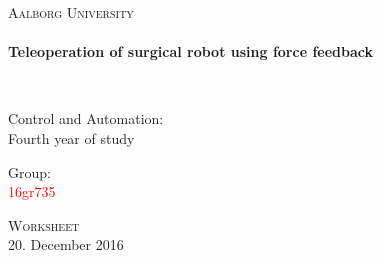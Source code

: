 %

\thispagestyle{empty}

\begin{center}

\vspace*{\fill}

\textsc{\LARGE Aalborg University}\\[1.0cm]

\HRule \\[0.4cm]
{ \HUGE \bfseries  Teleoperation of surgical robot using force feedback \\[0.5cm] }

\HRule \\[1.5cm]%


\begin{minipage}{0.4\textwidth}
\begin{flushleft} \large
Control and Automation:\\
Fourth year of study
\end{flushleft}
\end{minipage}
\begin{minipage}{0.4\textwidth}
\begin{flushright} \large
Group: \\
\textcolor{red}{16gr735}
\end{flushright}
\end{minipage}

\vspace*{\fill}

\textsc{\Large Worksheet}\\[1.0cm]

{\large 20. December 2016}

\end{center}